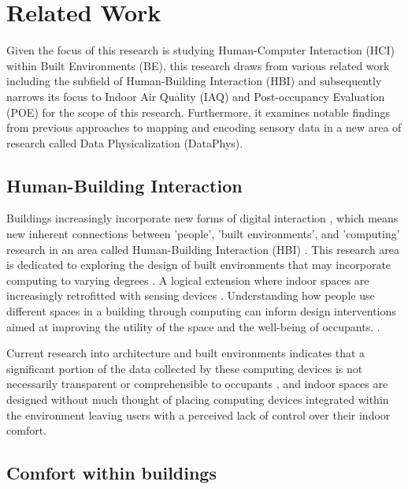 \section{Related Work}
\label{sec:related_work}
Given the focus of this research is studying Human-Computer Interaction (HCI) within Built Environments (BE), this research draws from various related work including the subfield of Human-Building Interaction (HBI) and subsequently narrows its focus to Indoor Air Quality (IAQ) and Post-occupancy Evaluation (POE) for the scope of this research. Furthermore, it examines notable findings from previous approaches to mapping and encoding sensory data in a new area of research called Data Physicalization (DataPhys).

\subsection{Human-Building Interaction}

Buildings increasingly incorporate new forms of digital interaction \cite{pulsipher_towards_2023, margariti_understanding_2023}, which means new inherent connections between 'people', 'built environments', and 'computing' research in an area called Human-Building Interaction (HBI) \cite{alavi_introduction_2019, taherkhani_human-building_2023}. This research area is dedicated to exploring the design of built environments that may incorporate computing to varying degrees \cite{sowles_introducing_2021}.  A logical extension where indoor spaces are increasingly retrofitted with sensing devices \cite{pulsipher_towards_2023}. Understanding how people use different spaces in a building through computing can inform design interventions aimed at improving the utility of the space and the well-being of occupants. \cite{verma_studying_2017}. 

Current research into architecture and built environments indicates that a significant portion of the data collected by these computing devices is not necessarily transparent or comprehensible to occupants \cite{schnadelbach_adaptive_2019}, and indoor spaces are designed without much thought of placing computing devices integrated within the environment \cite{johansen_temporal_2019, kirsh_architects_2019} leaving users with a perceived lack of control over their indoor comfort. 

\subsection{Comfort within buildings}

